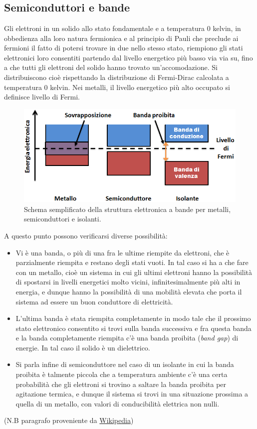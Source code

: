 \documentclass[
]{book}
\providecommand{\tightlist}{%
  \setlength{\itemsep}{0pt}\setlength{\parskip}{0pt}}
\begin{document}
\chapter{}\label{section}

\section{Semiconduttori e bande}\label{semiconduttori-e-bande}

Gli elettroni in un solido allo stato fondamentale e a temperatura \(0\)
kelvin, in obbedienza alla loro natura fermionica e al principio di
Pauli che preclude ai fermioni il fatto di potersi trovare in due nello
stesso stato, riempiono gli stati elettronici loro consentiti partendo
dal livello energetico più basso via via su, fino a che tutti gli
elettroni del solido hanno trovato un'accomodazione. Si distribuiscono
cioè rispettando la distribuzione di Fermi-Dirac calcolata a temperatura
0 kelvin. Nei metalli, il livello energetico più alto occupato si
definisce livello di Fermi.

\begin{figure}
\centering
\includegraphics[width=0.5\linewidth,height=\textheight,keepaspectratio]{immagini/bande.png}
\caption{Schema semplificato della struttura elettronica a bande per
metalli, semiconduttori e isolanti.}
\end{figure}

A questo punto possono verificarsi diverse possibilità:

\begin{itemize}
\tightlist
\item
  Vi è una banda, o più di una fra le ultime riempite da elettroni, che
  è parzialmente riempita e restano degli stati vuoti. In tal caso si ha
  a che fare con un metallo, cioè un sistema in cui gli ultimi elettroni
  hanno la possibilità di spostarsi in livelli energetici molto vicini,
  infinitesimalmente più alti in energia, e dunque hanno la possibilità
  di una mobilità elevata che porta il sistema ad essere un buon
  conduttore di elettricità.
\item
  L'ultima banda è stata riempita completamente in modo tale che il
  prossimo stato elettronico consentito si trovi sulla banda successiva
  e fra questa banda e la banda completamente riempita c'è una banda
  proibita (\emph{band gap}) di energie. In tal caso il solido è un
  dielettrico.
\item
  Si parla infine di semiconduttore nel caso di un isolante in cui la
  banda proibita è talmente piccola che a temperatura ambiente c'è una
  certa probabilità che gli elettroni si trovino a saltare la banda
  proibita per agitazione termica, e dunque il sistema si trovi in una
  situazione prossima a quella di un metallo, con valori di
  conducibilità elettrica non nulli.
\end{itemize}

(N.B paragrafo proveniente da
\href{https://it.wikipedia.org/wiki/Struttura_elettronica_a_bande}{Wikipedia})

\backmatter
\end{document}
